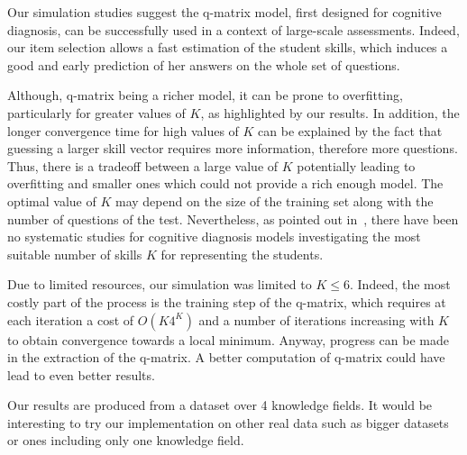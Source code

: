 \documentclass{sig-alternate}
\begin{document}
Our simulation studies suggest the q-matrix model, first designed for cognitive diagnosis, can be successfully used in a context of large-scale assessments. Indeed, our item selection allows a fast estimation of the student skills, which induces a good and early prediction of her answers on the whole set of questions. %

Although, q-matrix being a richer model, it can be prone to overfitting, particularly for greater values of $K$, as highlighted by our results. In addition, the longer convergence time for high values of $K$ can be explained by the fact that guessing a larger skill vector requires more information, therefore more questions. Thus, there is a tradeoff between a large value of $K$ potentially leading to overfitting and smaller ones which could not provide a rich enough model. The optimal value of $K$ may depend on the size of the training set along with the number of questions of the test. Nevertheless, as pointed out in~\cite{Huebner2010}, there have been no systematic studies for cognitive diagnosis models investigating the most suitable number of skills $K$ for representing the students.



Due to limited resources, our simulation was limited to $K \leqslant 6$. Indeed, the most costly part of the process is the training step of the q-matrix, which requires at each iteration a cost of $O(K 4^K)$ and a number of iterations increasing with $K$ to obtain convergence towards a local minimum. Anyway, progress can be made in the extraction of the q-matrix. A better computation of q-matrix could have lead to even better results.




Our results are produced from a dataset over 4 knowledge fields. It would be interesting to try our implementation on other real data such as bigger datasets or ones including only one knowledge field.
\end{document}
